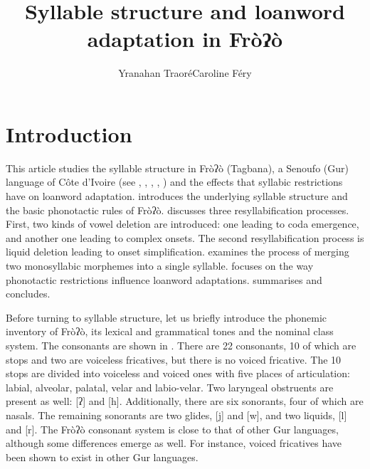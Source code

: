 \documentclass[output=paper]{langscibook}
\author{Yranahan Traoré\lastand Caroline Féry \affiliation{University of Frankfurt}}
\title{Syllable structure and loanword adaptation in Fròʔò}
\begin{document}
\maketitle

\section{Introduction}
\label{sec:traore:introduction:1}

This article studies the syllable structure in Fròʔò (Tagbana), a Senoufo (Gur) language of Côte d’Ivoire (see \citealt{Clamens1952}, \citealt{Manessy1962}, \citealt{Herault1973}, \citealt{Miehe2012}, \citealt{MieheEtAl2012}) and the effects that syllabic restrictions have on loanword adaptation.  introduces the underlying syllable structure and the basic phonotactic rules of Fròʔò.  discusses three resyllabification processes. First, two kinds of vowel deletion are introduced: one leading to coda emergence, and another one leading to complex onsets.  The second resyllabification process is liquid deletion leading to onset simplification.  examines the process of merging two monosyllabic morphemes into a single syllable.  focuses on the way phonotactic restrictions influence loanword adaptations.  summarises and concludes.

Before turning to syllable structure, let us briefly introduce the phonemic inventory of Fròʔò, its lexical and grammatical tones and the nominal class system. The consonants are shown in . 
There are 22 consonants, 10 of which are stops and two are voiceless fricatives, but there is no voiced fricative. The 10 stops are divided into voiceless and voiced ones with five places of articulation: labial, alveolar, palatal, velar and labio-velar. Two laryngeal obstruents are present as well: [ʔ] and [h]. Additionally, there are six sonorants, four of which are nasals. The remaining sonorants are two glides, [j] and [w], and two liquids, [l] and [r]. The Fròʔò consonant system is close to that of other ​​Gur languages, although some differences emerge as well. For instance, voiced fricatives have been shown to exist in other Gur languages.
\end{document}
